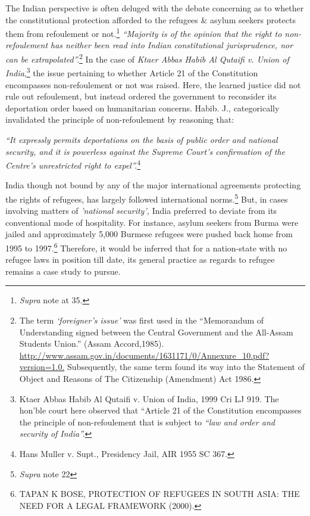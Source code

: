 \begin{multicols}{2}
\noi
The Indian perspective is often deluged with the debate concerning as to whether the
constitutional protection afforded to the refugees \& asylum seekers protects them from
refoulement or not.\footnote{\textit{Supra} note at 35.}  \textit{“Majority is of the opinion that the right to non-refoulement has neither
been read into Indian constitutional jurisprudence, nor can be extrapolated”.}\footnote{The term \textit{‘foreigner’s issue’} was first used in the “Memorandum of Understanding signed between the Central Government and the All-Assam Students Union.” (Assam Accord,1985).\\ \url{http://www.assam.gov.in/documents/1631171/0/Annexure_10.pdf?version=1.0.} Subsequently, the same term found its way into the Statement of Object and Reasons of The Citizenship (Amendment) Act 1986.} In the case of \textit{Ktaer Abbas Habib Al Qutaifi v. Union of India},\footnote{Ktaer Abbas Habib Al Qutaifi v. Union of India, 1999 Cri LJ 919. The hon’ble court here observed that “Article 21 of the Constitution encompasses the principle of non-refoulement that is subject to \textit{“law and order and security of India”.}} the issue pertaining to whether Article 21 of the Constitution encompasses non-refoulement or not was raised. Here, the learned justice
did not rule out refoulement, but instead ordered the government to reconsider its deportation
order based on humanitarian concerns. Habib. J., categorically invalidated the principle of
non-refoulement by reasoning that:

\noi
\textit{“It expressly permits deportations on the basis of public order and national security, and it is
powerless against the Supreme Court’s confirmation of the Centre’s unrestricted right to
expel”.}\footnote{Hans Muller v. Supt., Presidency Jail, AIR 1955 SC 367.}


\noi
India though not bound by any of the major international agreements protecting the rights of
refugees, has largely followed international norms.\footnote{\textit{Supra} note 22} But, in cases involving matters of
\textit{'national security',} India preferred to deviate from its conventional mode of hospitality. For
instance, asylum seekers from Burma were jailed and approximately 5,000 Burmese refugees
were pushed back home from 1995 to 1997.\footnote{TAPAN K BOSE, PROTECTION OF REFUGEES IN SOUTH ASIA: THE NEED FOR A LEGAL
FRAMEWORK (2000).} Therefore, it would be inferred that for a nation-state with no refugee laws in position till date, its general practice as regards to refugee remains a case study to pursue.


\end{multicols}
